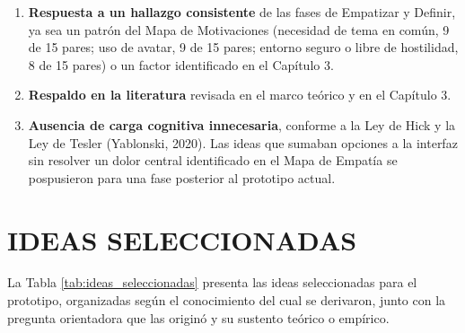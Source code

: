 \begin{enumerate}
    \item \textbf{Respuesta a un hallazgo consistente} de las fases de Empatizar y Definir, ya sea un patrón del Mapa de Motivaciones (necesidad de tema en común, 9 de 15 pares; uso de avatar, 9 de 15 pares; entorno seguro o libre de hostilidad, 8 de 15 pares) o un factor identificado en el Capítulo 3.
    \item \textbf{Respaldo en la literatura} revisada en el marco teórico y en el Capítulo 3.
    \item \textbf{Ausencia de carga cognitiva innecesaria}, conforme a la Ley de Hick y la Ley de Tesler (Yablonski, 2020). Las ideas que sumaban opciones a la interfaz sin resolver un dolor central identificado en el Mapa de Empatía se pospusieron para una fase posterior al prototipo actual.
\end{enumerate}

\section{IDEAS SELECCIONADAS}
La Tabla \ref{tab:ideas_seleccionadas} presenta las ideas seleccionadas para el prototipo, organizadas según el conocimiento del cual se derivaron, junto con la pregunta orientadora que las originó y su sustento teórico o empírico.

